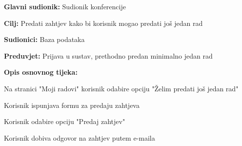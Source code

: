 					\noindent {}
					\begin{packed_item}
	
						\item \textbf{Glavni sudionik: } Sudionik konferencije
						\item  \textbf{Cilj:} Predati zahtjev kako bi korisnik mogao predati još jedan rad
						\item  \textbf{Sudionici:} Baza podataka
						\item  \textbf{Preduvjet:} Prijava u sustav, prethodno predan minimalno jedan rad
						\item  \textbf{Opis osnovnog tijeka:}
						
						\item[] \begin{packed_enum}
	
							\item Na stranici "Moji radovi" korisnik odabire opciju "Želim predati još jedan rad"
							\item Korisnik ispunjava formu za predaju zahtjeva
							\item Korisnik odabire opciju "Predaj zahtjev"
							\item Korisnik dobiva odgovor na zahtjev putem e-maila

					
						\end{packed_enum}
			
					\end{packed_item}
					\noindent {}
